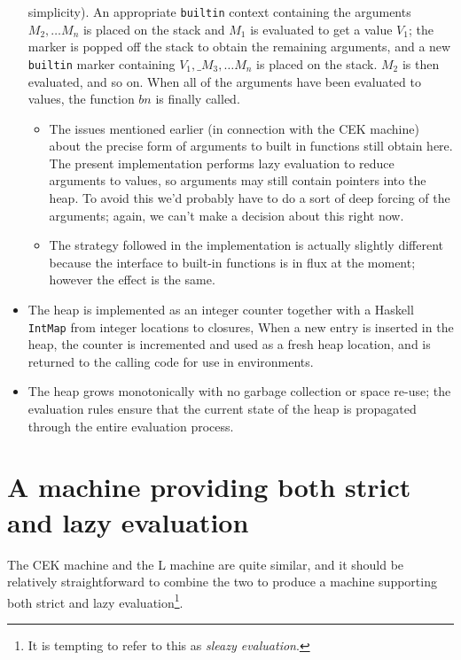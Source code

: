 \documentclass[a4paper]{article}
\begin{document}
\begin{itemize}
    simplicity). An appropriate \texttt{builtin} context containing
    the arguments $M_2, \ldots M_n$ is placed on the stack and $M_1$ is
    evaluated to get a value $V_1$; the marker is popped off the stack to 
    obtain the remaining arguments, and a new \texttt{builtin} marker 
    containing $V_1, \_ M_3, \ldots M_n$ is placed on the stack.  $M_2$ is
    then evaluated, and so on.  When all of the arguments have been evaluated
    to values, the function $bn$ is finally called.
    \begin{itemize}
      \item The issues mentioned earlier (in connection with the CEK
        machine) about the precise form of arguments to built in
        functions still obtain here.  The present implementation
        performs lazy evaluation to reduce arguments to values, so
        arguments may still contain pointers into the heap.  To avoid
        this we'd probably have to do a sort of deep forcing of the
        arguments; again, we can't make a decision about this right now.
      \item The strategy followed in the implementation is actually slightly different
        because the interface to built-in functions is in flux at the moment; however
        the effect is the same.
    \end{itemize}
  \item The heap is implemented as an integer counter together with a
    Haskell \texttt{IntMap} from integer locations to closures,
    When a new entry is inserted in the heap, the counter
    is incremented and used as a fresh heap location, and is returned 
    to the calling code for use in environments.
  \item The heap grows monotonically with no garbage collection or space re-use;
    the evaluation rules ensure that the current state of the heap is propagated 
    through the entire evaluation process.
    
\end{itemize}


\newpage

\section{A machine providing both strict and lazy evaluation}\label{sec:strict-lazy}
The CEK machine and the L machine are quite similar, and it should be
relatively straightforward to combine the two to produce a machine
supporting both strict and lazy evaluation\footnote{It is tempting to
  refer to this as \textit{sleazy evaluation}.}.
\end{document}
